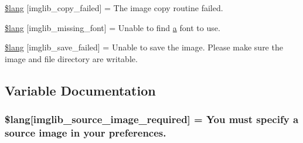 \begin{DoxyCompactItemize}
\item 
\hyperlink{_admin_2system_2language_2english_2imglib__lang_8php_a9363000d2005b8276b39d581a11b562d}{\$lang} \mbox{[}\textquotesingle{}imglib\+\_\+copy\+\_\+failed\textquotesingle{}\mbox{]} = \textquotesingle{}The image copy routine failed.\textquotesingle{}
\item 
\hyperlink{_admin_2system_2language_2english_2imglib__lang_8php_a935800aad2be18ca4fe99bb074674848}{\$lang} \mbox{[}\textquotesingle{}imglib\+\_\+missing\+\_\+font\textquotesingle{}\mbox{]} = \textquotesingle{}Unable to find \hyperlink{_admin_2assets_2js_2bootstrap_8min_8js_a1f5870dcf487187f13d5fd328ed9e6e7}{a} font to use.\textquotesingle{}
\item 
\hyperlink{_admin_2system_2language_2english_2imglib__lang_8php_a4d7a99fddc60c97a7327fa0125dea264}{\$lang} \mbox{[}\textquotesingle{}imglib\+\_\+save\+\_\+failed\textquotesingle{}\mbox{]} = \textquotesingle{}Unable to save the image. Please make sure the image and file directory are writable.\textquotesingle{}
\end{DoxyCompactItemize}


\subsection{Variable Documentation}
\hypertarget{_admin_2system_2language_2english_2imglib__lang_8php_af48787ab142f633036ebdf1cc5da7409}{}
\subsubsection[{\$lang}]{\setlength{\rightskip}{0pt plus 5cm}\$lang\mbox{[}\textquotesingle{}imglib\+\_\+source\+\_\+image\+\_\+required\textquotesingle{}\mbox{]} = \textquotesingle{}You must specify {\bf a} source image in your preferences.\textquotesingle{}}\label{_admin_2system_2language_2english_2imglib__lang_8php_af48787ab142f633036ebdf1cc5da7409}
\hypertarget{_admin_2system_2language_2english_2imglib__lang_8php_aa8d7f8276e62fbe759daef2021c16552}{}
